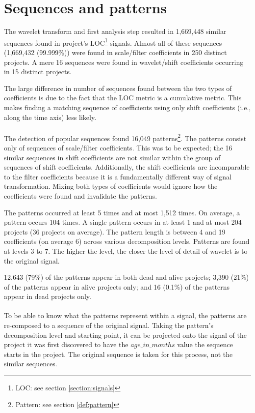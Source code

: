 \section{Sequences and patterns}
The wavelet transform and first analysis step resulted in 1,669,448 similar
sequences found in project's LOC\footnote{LOC: see section
\ref{section:signals}} signals. Almost all of these sequences (1,669,432
(99.999\%)) were found in scale/filter coefficients in 250 distinct projects.
A mere 16 sequences were found in wavelet/shift coefficients occurring in 15
distinct projects.

The large difference in number of sequences found between the two types of
coefficients is due to the fact that the LOC metric is a cumulative metric.
This makes finding a matching sequence of coefficients using only shift
coefficients (i.e., along the time axis) less likely.

\paragraph{}
The detection of popular sequences found 16,049 patterns\footnote{Pattern:
see section \ref{def:pattern}}. The patterns consist only of sequences
of scale/filter coefficients. This was to be expected; the 16 similar sequences
in shift coefficients are not similar within the group of sequences of shift
coefficients. Additionally, the shift coefficients are incomparable to the
filter coefficients because it is a fundamentally different way of signal
transformation. Mixing both types of coefficients would ignore how the
coefficients were found and invalidate the patterns.

The patterns occurred at least 5 times and at most 1,512 times. On average, a
pattern occurs 104 times. A single pattern occurs in at least 1 and at most 204
projects (36 projects on average). The pattern length is between 4 and 19
coefficients (on average 6) across various decomposition levels. Patterns are
found at levels 3 to 7. The higher the level, the closer the level of detail of
wavelet is to the original signal.

12,643 (79\%) of the patterns appear in both dead and alive projects; 3,390
(21\%) of the patterns appear in alive projects only; and 16 (0.1\%) of the
patterns appear in dead projects only.

\paragraph{}
To be able to know what the patterns represent within a signal, the patterns are
re-composed to a sequence of the original signal. Taking the pattern's
decomposition level and starting point, it can be projected onto the signal of
the project it was first discovered to have the $age\_in\_months$ value the
sequence starts in the project. The original sequence is taken for this
process, not the similar sequences.


